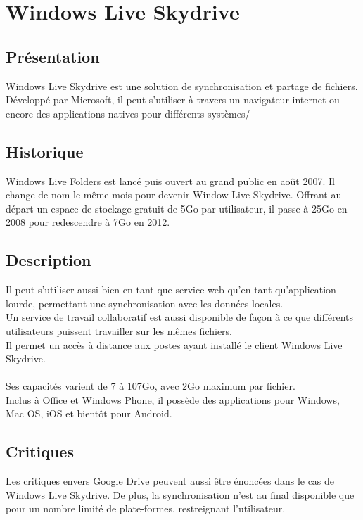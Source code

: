 \section{Windows Live Skydrive}
\thispagestyle{EIP} %

\subsection{Présentation}
Windows Live Skydrive est une solution de synchronisation et partage de fichiers. Développé par Microsoft, il peut s'utiliser à travers un navigateur internet ou encore des applications natives pour différents systèmes/

\subsection{Historique}
Windows Live Folders est lancé puis ouvert au grand public en août 2007. Il change de nom le même mois pour devenir Window Live Skydrive. Offrant au départ un espace de stockage gratuit de 5Go par utilisateur, il passe à 25Go en 2008 pour redescendre à 7Go en 2012.\\

\subsection{Description}
Il peut s'utiliser aussi bien en tant que service web qu'en tant qu'application lourde, permettant une synchronisation avec les données locales.\\
Un service de travail collaboratif est aussi disponible de façon à ce que différents utilisateurs puissent travailler sur les mêmes fichiers.\\
Il permet un accès à distance aux postes ayant installé le client Windows Live Skydrive.\\
\\
Ses capacités varient de 7 à 107Go, avec 2Go maximum par fichier.\\
Inclus à Office et Windows Phone, il possède des applications pour Windows, Mac OS, iOS et bientôt pour Android.\\

\subsection{Critiques}
Les critiques envers Google Drive peuvent aussi être énoncées dans le cas de Windows Live Skydrive. De plus, la synchronisation n'est au final disponible que pour un nombre limité de plate-formes, restreignant l'utilisateur.